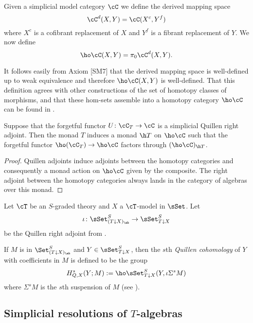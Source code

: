 \documentclass[leqno,oneside,english]{elsarticle}
\begin{document}
\begin{defn}\label{def:homotopy-classes-of-maps}
  Given a simplicial model category $\cC$ we define the derived mapping
  space 
  \[
  \cC^{d}(X,Y)= \cC(X^{c}, Y^{f})
  \] 
  where $X^{c}$ is a cofibrant replacement of $X$ and $Y^{f}$
  is a fibrant replacement of $Y$. We now define
  \[ 
  \ho\cC(X,Y)=\pi_0 \cC^d(X,Y). 
  \]
\end{defn}

It follows easily from Axiom [SM7] that the derived mapping space is
well-defined up to weak equivalence and therefore $\ho\cC(X,Y)$ is
well-defined. That this definition agrees with other constructions of
the set of homotopy classes of morphisms, and that these hom-sets
assemble into a homotopy category $\ho\cC$ can be found in
\cite[Prop.~II.3.10 + \S~II.3]{GoJ99}.

\begin{prop}\label{prop:homotopy-monad}
  Suppose that the forgetful functor $U\colon\cC_T\rightarrow \cC$ is a
  simplicial Quillen right adjoint. Then the monad $T$ induces a monad $\h T$ on 
  $\ho \cC$ such that the forgetful functor $\ho (\cC_T)\rightarrow
  \ho \cC $ factors through $(\ho \cC)_{\h T}$.
\end{prop}
\begin{proof}
  Quillen adjoints induce adjoints between the homotopy categories and
  consequently a monad action on $\ho \cC$ given by the composite. The
  right adjoint between the homotopy categories always lands in the
  category of algebras over this monad.
\end{proof}

\begin{defn}
  \label{def:andre-quillen-cohomology}
  Let $\cT$ be an $S$-graded theory and $X$ a $\cT$-model in $\sSet$.
  Let  \[ 
  \iota \colon \sSet^{S}_{(T{\downarrow X})_\ab}\rightarrow
  \sSet^{S}_{T{\downarrow X}} \] be the Quillen right adjoint from
  .

  If $M$ is in $\Set^{S}_{(T{\downarrow
      X})_\ab}$ and
  $Y\in \sSet^{S}_{T{\downarrow X}}$, then the $s$th
  \emph{Quillen cohomology} of $Y$ with coefficients in $M$ is defined to
  be the group
   \[
   H^s_{Q,X}(Y; M) := 
   \ho \sSet^{S}_{T \downarrow X}( Y, \iota\Sigma^s M)
   \]
   where $\Sigma^s M$ is the $s$th suspension of $M$ (see \cite{Qui67}).
\end{defn}

\subsection{Simplicial resolutions of \texorpdfstring{$T$}{T}-algebras} \label{sec:simplicial-resolutions}
\end{document}
